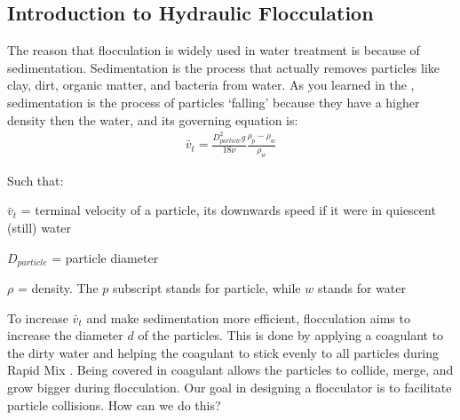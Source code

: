 \documentclass[letterpaper,10pt,english]{sphinxmanual}
\begin{document}
\subsection{Introduction to Hydraulic Flocculation}
\label{\detokenize{Flocculation/Floc_Design:introduction-to-hydraulic-flocculation}}
The reason that flocculation is widely used in water treatment is because of sedimentation. Sedimentation is the process that actually removes particles like clay, dirt, organic matter, and bacteria from water. As you learned in the
{\hyperref[\detokenize{Introduction/Introduction:heading-treatment-trains}]{}}, sedimentation is the process of particles ‘falling’ because they have a higher density then the water, and its governing equation is:
\begin{equation}\label{equation:Flocculation/Floc_Design:Flocculation/Floc_Design:0}
\begin{split}\bar v_t = \frac{D_{particle}^2 g}{18 \nu} \frac{\rho_p - \rho_w}{\rho_w}\end{split}
\end{equation}
\begin{DUlineblock}{0em}
\item[] Such that:
\item[] \(\bar v_t\) = terminal velocity of a particle, its downwards speed if it were in quiescent (still) water
\item[] \(D_{particle}\) = particle diameter
\item[] \(\rho\) = density. The \(p\) subscript stands for particle, while \(w\) stands for water
\end{DUlineblock}

To increase \(\bar v_t\) and make sedimentation more efficient, flocculation aims to increase the diameter \(d\) of the particles. This is done by applying a coagulant to the dirty water and helping the coagulant to stick evenly to all particles during Rapid Mix . Being covered in coagulant allows the particles to collide, merge, and grow bigger during flocculation.
Our goal in designing a flocculator is to facilitate particle collisions. How can we do this?
\end{document}
